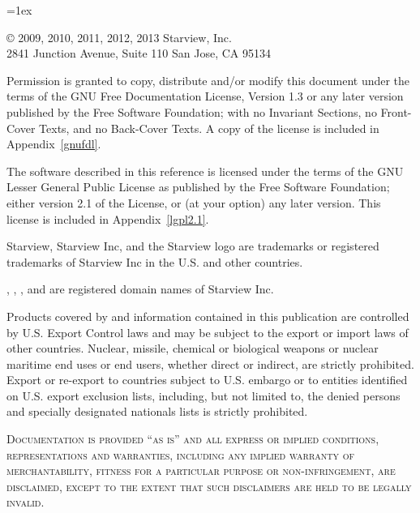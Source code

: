 \documentclass[11pt,openright,fleqn]{book}
\begin{document}
\newpage{}
{{
\parindent=0in
\parskip=1ex

\thispagestyle{fancy}
\fancyhf{} %
\newcommand{\tstamp}{\today}   
\newcommand{\Draft}{\sc draft}

\copyright{} 2009, 2010, 2011, 2012, 2013 Starview, Inc.\\
2841 Junction Avenue, Suite 110 San Jose, CA 95134
\vspace*{1ex}


Permission is granted to copy, distribute and/or modify this document
under the terms of the GNU Free Documentation License, Version 1.3
or any later version published by the Free Software Foundation;
with no Invariant Sections, no Front-Cover Texts, and no Back-Cover Texts.
A copy of the license is included in Appendix~\vref{gnufdl}.

The software described in this reference is licensed under the terms of the
GNU Lesser General Public License as published by the Free Software Foundation; either version 2.1 of the License, or (at your option) any later version. This license is included in Appendix~\vref{lgpl2.1}.

Starview, Starview Inc, and the Starview logo are trademarks or registered trademarks of Starview Inc in the U.S. and other countries.

, , , and  are registered domain names of Starview Inc.

Products covered by and information contained in this publication are controlled by U.S. Export Control laws and may be subject to the export or import laws of other countries. Nuclear, missile, chemical or biological weapons or nuclear maritime end uses or end users, whether direct or indirect, are strictly prohibited. Export or re-export to countries subject to U.S. embargo or to entities identified on U.S. export exclusion lists, including, but not limited to, the denied persons and specially designated nationals lists is strictly prohibited.

\textsc{Documentation is provided ``as is'' and all express or implied conditions, representations and warranties, including any implied warranty of merchantability, fitness for a particular purpose or non-infringement, are disclaimed, except to the extent that such disclaimers are held to be legally invalid.}
}
\newpage{}

\pagestyle{fancy}
\renewcommand{\chaptermark}[1]{\markboth{\thechapter\ #1}{}} \renewcommand{\sectionmark}[1]{\markright{\thesection\ #1}}
\fancyhf{} %

}
\end{document}
